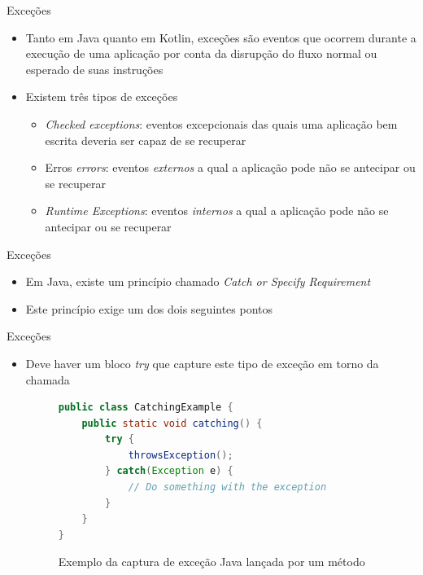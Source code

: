 \documentclass[brazilian]{beamer}
\begin{document}
\begin{frame}{Exceções}
    \begin{itemize}
        \item Tanto em Java quanto em Kotlin, exceções são eventos que ocorrem durante a execução de uma aplicação por conta da disrupção do fluxo normal ou esperado de suas instruções
        \item Existem três tipos de exceções
        \begin{itemize}
            \item \textit{Checked exceptions}: eventos excepcionais das quais uma aplicação bem escrita deveria ser capaz de se recuperar
            \item Erros \textit{errors}: eventos \emph{externos} a qual a aplicação pode não se antecipar ou se recuperar
            \item \textit{Runtime Exceptions}: eventos \emph{internos} a qual a aplicação pode não se antecipar ou se recuperar
        \end{itemize}
    \end{itemize}
\end{frame}

\begin{frame}{Exceções}
    \begin{itemize}
        \item Em Java, existe um princípio chamado \textit{Catch or Specify Requirement}
        \item Este princípio exige um dos dois seguintes pontos
    \end{itemize}
\end{frame}

\begin{frame}[fragile]{Exceções}
    \begin{itemize}
        \item Deve haver um bloco \emph{try} que capture este tipo de exceção em torno da chamada
        \begin{figure}[H]
            \centering
            \begin{lstlisting}[language=Java]
public class CatchingExample {
    public static void catching() {
        try {
            throwsException();
        } catch(Exception e) {
            // Do something with the exception
        }
    }
}
            \end{lstlisting}
            \caption{Exemplo da captura de exceção Java lançada por um método}
            \label{fig:java_catching_exception}
        \end{figure}
    \end{itemize}
\end{frame}
\end{document}
